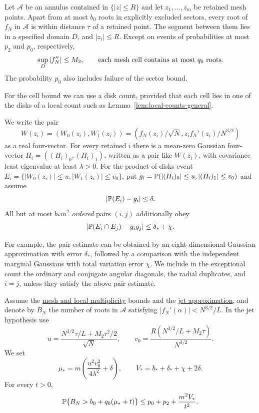 \begin{namedhypothesis}\label{hyp:mesh}
Let $\mathcal A$ be an annulus contained in $\{|z|\leq R\}$ and let
$z_1,\ldots,z_m$ be retained mesh points.  Apart from at most $b_0$
roots in explicitly excluded sectors, every root of $f_N$ in $\mathcal A$
is within distance $\tau$ of a retained point. The segment between them
lies in a specified domain $D$, and $|z_i|\leq R$.
Except on events of probabilities at most $p_2$ and $p_0$, respectively,
\[
 \sup_D|f_N''|\leq M_2,
 \qquad\hbox{each mesh cell contains at most $q_0$ roots.}
\]
The probability $p_0$ also
includes failure of the sector bound.
\end{namedhypothesis}
For the cell bound we can use a disk count, provided that each cell lies
in one of the disks of a local count such as
Lemma~\ref{lem:local-counts-general}.

\begin{namedhypothesis}\label{hyp:jets}
We write the pair
\[
 W(z_i)=(W_0(z_i),W_1(z_i))=(f_N(z_i)/\sqrt N,z_if_N'(z_i)/N^{3/2})
\]
as a real four-vector.
For every retained $i$ there is a mean-zero Gaussian four-vector
$H_i=((H_i)_0,(H_i)_1)$, written as a pair like $W(z_i)$,
with covariance least eigenvalue at least $\lambda>0$.  For the
product-of-disks event
$E_i=\{|W_0(z_i)|\leq u,|W_1(z_i)|\leq v_0\}$, put
$g_i=\mathbb P(|(H_i)_0|\leq u,|(H_i)_1|\leq v_0)$ and assume
\[
 |\mathbb P(E_i)-g_i|\leq\delta.
\]
All but at most $b_*m^2$ \emph{ordered} pairs $(i,j)$ additionally obey
\[
 |\mathbb P(E_i\cap E_j)-g_i g_j|\leq\delta_*+\chi.
\]
\end{namedhypothesis}
For example, the pair estimate can be obtained by an eight-dimensional
Gaussian approximation with error $\delta_*$, followed by a comparison
with the independent marginal Gaussians with total variation error
$\chi$. We include in the exceptional count the ordinary and conjugate
angular diagonals, the radial duplicates, and $i=j$, unless they satisfy
the above pair estimate.

\begin{theorem}\label{thm:T3}
Assume the \hyperref[hyp:mesh]{mesh and local multiplicity} bounds and the
\hyperref[hyp:jets]{jet approximation}, and denote by $B_N$ the number of
roots in $\mathcal A$ satisfying $|f_N'(\alpha)|<N^{3/2}/L$.
In the jet hypothesis use
\[
 u=\frac{N^{3/2}\tau/L+M_2\tau^2/2}{\sqrt N},\qquad
 v_0=\frac{R(N^{3/2}/L+M_2\tau)}{N^{3/2}}.
\]
We set
\[
 \mu_* =m\left(\frac{u^2v_0^2}{4\lambda^2}+\delta\right),
 \qquad V_*=b_*+\delta_*+\chi+2\delta.
\]
For every $t>0$,
\begin{equation}
 \mathbb P\{B_N>b_0+q_0(\mu_*+t)\}
       \leq p_0+p_2+\frac{m^2V_*}{t^2}. \label{eq:T3-general}
\end{equation}
\end{theorem}


